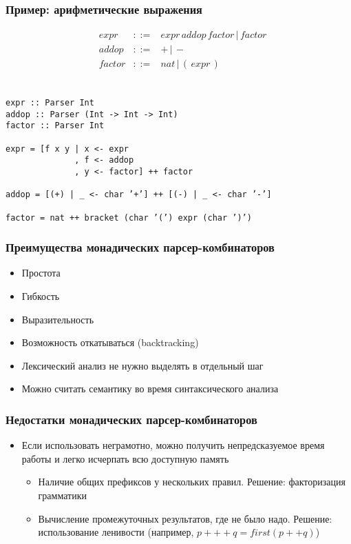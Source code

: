 \documentclass{beamer}
\begin{document}
\begin{frame}[fragile]
  \transwipe[direction=90]
  \frametitle{Пример: арифметические выражения}
$$
\begin{array}{crcl}
&expr & ::= & expr \, addop \, factor \, | \, factor \\ 
&addop & ::= & + \, | \, - \\ 
&factor & ::= & nat \, | \, ( \, expr \, ) \\
\end{array}
$$ 

\begin{verbatim}

expr :: Parser Int
addop :: Parser (Int -> Int -> Int)
factor :: Parser Int

expr = [f x y | x <- expr
              , f <- addop
              , y <- factor] ++ factor

addop = [(+) | _ <- char ’+’] ++ [(-) | _ <- char ’-’]

factor = nat ++ bracket (char ’(’) expr (char ’)’)
\end{verbatim}
\end{frame}

\begin{frame}[fragile]
  \transwipe[direction=90]
  \frametitle{Преимущества монадических парсер-комбинаторов}
  \begin{itemize}
    \item Простота
    \item Гибкость
    \item Выразительность
    \item Возможность откатываться (backtracking)
    \item Лексический анализ не нужно выделять в отдельный шаг
    \item Можно считать семантику во время синтаксического анализа
  \end{itemize}
\end{frame}

\begin{frame}[fragile]
  \transwipe[direction=90]
  \frametitle{Недостатки монадических парсер-комбинаторов}
  \begin{itemize}
    \item Если использовать неграмотно, можно получить непредсказуемое время 
работы и легко исчерпать всю доступную память
    \begin{itemize}
      \item Наличие общих префиксов у нескольких правил. Решение: факторизация грамматики
      \item Вычисление промежуточных результатов, где не было надо. Решение: использование ленивости (например, $p +++ q = first (p ++ q)$)
    \end{itemize}
  \end{itemize}
\end{frame}
\end{document}
